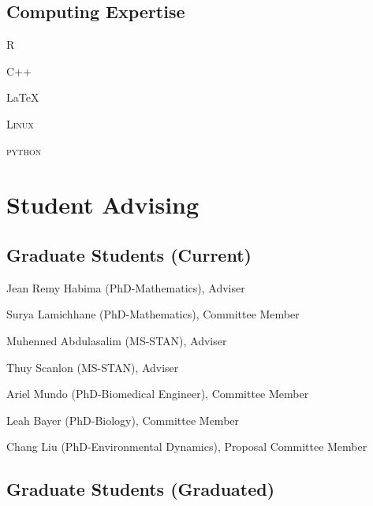 \documentclass[11pt,]{article}
\providecommand{\tightlist}{%
  \setlength{\itemsep}{0pt}\setlength{\parskip}{0pt}}
\renewenvironment{itemize}{
  \begin{list}{}{
    \setlength{\leftmargin}{1.5em}
  }
}{
  \end{list}
}
\begin{document}
\hypertarget{computing-expertise}{%
\subsection{Computing Expertise}\label{computing-expertise}}

\begin{multicols}{3}
\begin{itemize}
\item \textsc{R} 
\item \textsc{C++}
\item \LaTeX 
\item \textsc{Linux}
\item \textsc{python}
\end{itemize}
\end{multicols}

\hypertarget{student-advising}{%
\section{Student Advising}\label{student-advising}}

\hypertarget{graduate-students-current}{%
\subsection{Graduate Students
(Current)}\label{graduate-students-current}}

\begin{itemize}
\tightlist
\item
  Jean Remy Habima (PhD-Mathematics), Adviser
\item
  Surya Lamichhane (PhD-Mathematics), Committee Member
\item
  Muhenned Abdulasalim (MS-STAN), Adviser
\item
  Thuy Scanlon (MS-STAN), Adviser
\item
  Ariel Mundo (PhD-Biomedical Engineer), Committee Member
\item
  Leah Bayer (PhD-Biology), Committee Member
\item
  Chang Liu (PhD-Environmental Dynamics), Proposal Committee Member
\end{itemize}

\hypertarget{graduate-students-graduated}{%
\subsection{Graduate Students
(Graduated)}\label{graduate-students-graduated}}
\end{document}
